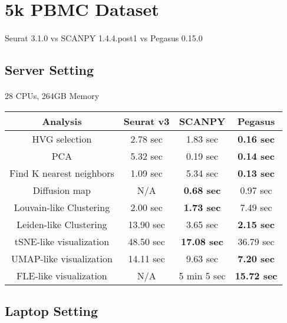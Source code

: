 \documentclass[10pt]{article}
\begin{document}
\section{5k PBMC Dataset}

\paragraph{}
Seurat 3.1.0 \qquad vs \qquad SCANPY 1.4.4.post1 \qquad vs \qquad Pegasus 0.15.0

\subsection{Server Setting}

\paragraph{}
28 CPUs, 264GB Memory

\begin{table}[H]
	\centering
	\begin{tabular}{|c|c|c|c|}
		\hline
		Analysis & Seurat v3 & SCANPY & Pegasus\\
		\hline \hline
		HVG selection & 2.78 sec & 1.83 sec  & \textbf{0.16 sec}  \\
		\hline
		PCA & 5.32 sec & 0.19 sec & \textbf{0.14 sec}  \\
		\hline
		Find K nearest neighbors & 1.09 sec  & 5.34 sec & \textbf{0.13 sec} \\
		\hline
		Diffusion map & N/A & \textbf{0.68 sec} & 0.97 sec  \\
		\hline
		Louvain-like Clustering & 2.00 sec & \textbf{1.73 sec} & 7.49 sec \\
		\hline 
		Leiden-like Clustering & 13.90 sec & 3.65 sec & \textbf{2.15 sec} \\
		\hline
		tSNE-like visualization & 48.50 sec & \textbf{17.08 sec} & 36.79 sec  \\
		\hline
		UMAP-like visualization & 14.11 sec & 9.63 sec & \textbf{7.20 sec} \\
		\hline
		FLE-like visualization & N/A & 5 min 5 sec & \textbf{15.72 sec} \\
		\hline
	\end{tabular}
\end{table}

\subsection{Laptop Setting}
\end{document}
